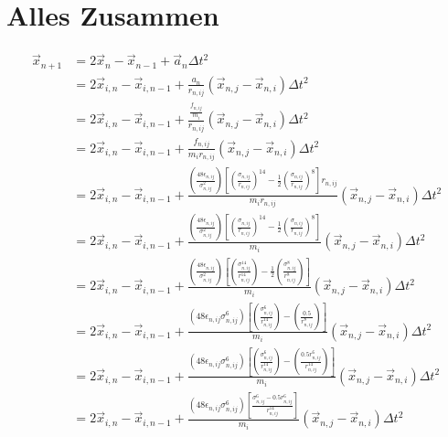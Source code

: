 \documentclass{article}
\begin{document}
\section*{Alles Zusammen}
\begin{align}
	\vec{x}_{n+1}&=2\vec{x}_n-\vec{x}_{n-1}+\vec{a}_n\Delta t^2\\
	&=2\vec{x}_{i,n}-\vec{x}_{i,n-1}+\frac{a_n}{r_{n,ij}}\left(\vec{x}_{n,j}-\vec{x}_{n,i}\right)\Delta t^2\\
	&=2\vec{x}_{i,n}-\vec{x}_{i,n-1}+\frac{\frac{f_{n,ij}}{m_i}}{r_{n,ij}}\left(\vec{x}_{n,j}-\vec{x}_{n,i}\right)\Delta t^2\\
	&=2\vec{x}_{i,n}-\vec{x}_{i,n-1}+\frac{f_{n,ij}}{m_ir_{n,ij}}\left(\vec{x}_{n,j}-\vec{x}_{n,i}\right)\Delta t^2\\
	&=2\vec{x}_{i,n}-\vec{x}_{i,n-1}+\frac{\left(\frac{48\epsilon_{n,ij}}{\sigma_{n,ij}^2}\right)\left[\left(\frac{\sigma_{n,ij}}{r_{n,ij}}\right)^{14}-\frac{1}{2}\left(\frac{\sigma_{n,ij}}{r_{n,ij}}\right)^8\right]r_{n,ij}}{m_ir_{n,ij}}\left(\vec{x}_{n,j}-\vec{x}_{n,i}\right)\Delta t^2\\
	&=2\vec{x}_{i,n}-\vec{x}_{i,n-1}+\frac{\left(\frac{48\epsilon_{n,ij}}{\sigma_{n,ij}^2}\right)\left[\left(\frac{\sigma_{n,ij}}{r_{n,ij}}\right)^{14}-\frac{1}{2}\left(\frac{\sigma_{n,ij}}{r_{n,ij}}\right)^8\right]}{m_i}\left(\vec{x}_{n,j}-\vec{x}_{n,i}\right)\Delta t^2\\
	&=2\vec{x}_{i,n}-\vec{x}_{i,n-1}+\frac{\left(\frac{48\epsilon_{n,ij}}{\sigma_{n,ij}^2}\right)\left[\left(\frac{\sigma_{n,ij}^{14}}{r_{n,ij}^{14}}\right)-\frac{1}{2}\left(\frac{\sigma_{n,ij}^8}{r_{n,ij}^8}\right)\right]}{m_i}\left(\vec{x}_{n,j}-\vec{x}_{n,i}\right)\Delta t^2\\
	&=2\vec{x}_{i,n}-\vec{x}_{i,n-1}+\frac{\left(48\epsilon_{n,ij}\sigma_{n,ij}^{6}\right)\left[\left(\frac{\sigma_{n,ij}^{6}}{r_{n,ij}^{14}}\right)-\left(\frac{0.5}{r_{n,ij}^8}\right)\right]}{m_i}\left(\vec{x}_{n,j}-\vec{x}_{n,i}\right)\Delta t^2\\
	&=2\vec{x}_{i,n}-\vec{x}_{i,n-1}+\frac{\left(48\epsilon_{n,ij}\sigma_{n,ij}^{6}\right)\left[\left(\frac{\sigma_{n,ij}^{6}}{r_{n,ij}^{14}}\right)-\left(\frac{0.5r_{n,ij}^6}{r_{n,ij}^{14}}\right)\right]}{m_i}\left(\vec{x}_{n,j}-\vec{x}_{n,i}\right)\Delta t^2\\
	&=2\vec{x}_{i,n}-\vec{x}_{i,n-1}+\frac{\left(48\epsilon_{n,ij}\sigma_{n,ij}^{6}\right)\left[\frac{\sigma_{n,ij}^{6}-0.5r_{n,ij}^6}{r_{n,ij}^{14}}\right]}{m_i}\left(\vec{x}_{n,j}-\vec{x}_{n,i}\right)\Delta t^2\\
\end{align}
\end{document}
